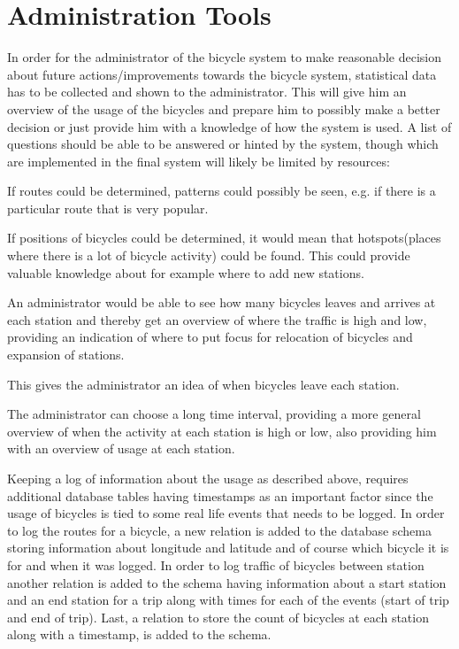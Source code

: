 \section{Administration Tools}
In order for the administrator of the bicycle system to make reasonable decision about future actions/improvements towards the bicycle system, statistical data has to be collected and shown to the administrator. This will give him an overview of the usage of the bicycles and prepare him to possibly make a better decision or just provide him with a knowledge of how the system is used.
A list of questions should be able to be answered or hinted by the system, though which are implemented in the final system will likely be limited by resources:

\begin{description}[style=nextline]
\item[Which routes are used?] If routes could be determined, patterns could possibly be seen, e.g. if there is a particular route that is very popular.
\item[Are there hotspots for bicycles?] If positions of bicycles could be determined, it would mean that hotspots(places where there is a lot of bicycle activity) could be found. 
This could provide valuable knowledge about for example where to add new stations.
\item[Where is the most traffic of bicycles during some period?] An administrator would be able to see how many bicycles leaves and arrives at each station and thereby get an overview of where the traffic is high and low, providing an indication of where to put focus for relocation of bicycles and expansion of stations.
\item[What is the current amount of bicycles at a given station?] This gives the administrator an idea of when bicycles leave each station.
\item[How does the amount of bicycles at a given station change over time?] The administrator can choose a long time interval, providing a more general overview of when the activity at each station is high or low, also providing him with an overview of usage at each station.
\end{description}

Keeping a log of information about the usage as described above, requires additional database tables having timestamps as an important factor since the usage of bicycles is tied to some real life events that needs to be logged. 
In order to log the routes for a bicycle, a new relation is added to the database schema storing information about longitude and latitude and of course which bicycle it is for and when it was logged.
In order to log traffic of bicycles between station another relation is added to the schema having information about a start station and an end station for a trip along with times for each of the events (start of trip and end of trip).
Last, a relation to store the count of bicycles at each station along with a timestamp, is added to the schema.

